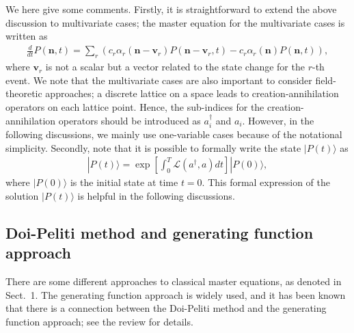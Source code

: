 \documentclass[sn-mathphys,Numbered]{sn-jnl}%
\theoremstyle{thmstyleone}%
\theoremstyle{thmstyletwo}%
\theoremstyle{thmstylethree}%
\begin{document}
We here give some comments. Firstly, it is straightforward to extend the above discussion to multivariate cases; the master equation for the multivariate cases is written as
\begin{align}
\frac{d}{dt} P(\bm{n},t)
= \sum_{r} \left( c_r \alpha_r(\bm{n}-\bm{v}_r) P(\bm{n}-\bm{v}_r,t) - c_r \alpha_r(\bm{n}) P(\bm{n},t) \right),
\end{align}
where $\bm{v}_r$ is not a scalar but a vector related to the state change for the $r$-th event. We note that the multivariate cases are also important to consider field-theoretic approaches; a discrete lattice on a space leads to creation-annihilation operators on each lattice point. Hence, the sub-indices for the creation-annihilation operators should be introduced as $a_i^\dagger$ and $a_i$. However, in the following discussions, we mainly use one-variable cases because of the notational simplicity. Secondly, note that it is possible to formally write the state $|P(t)\rangle$ as
\begin{align}
| P(t) \rangle = \exp\left[ \int_0^T \mathcal{L} (a^\dagger,a) dt\right] | P(0) \rangle,
\label{eq_Doi_Peliti_formal}
\end{align}
where $|P(0)\rangle$ is the initial state at time $t=0$. This formal expression of the solution $|P(t)\rangle$ is helpful in the following discussions.



\subsection{Doi-Peliti method and generating function approach}

There are some different approaches to classical master equations, as denoted in Sect.~1. The generating function approach is widely used, and it has been known that there is a connection between the Doi-Peliti method and the generating function approach; see the review \cite{Weber2017} for details.
\end{document}

